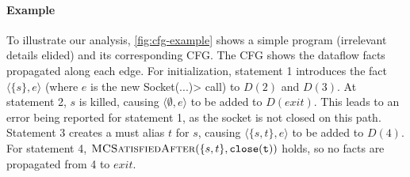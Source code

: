 \paragraph{Example} To illustrate our analysis, \cref{fig:cfg-example} shows a
simple program (irrelevant details elided) and its corresponding CFG.
The CFG shows the dataflow facts propagated along each edge.
For initialization, statement 1 introduces the fact $\langle \{ s \}, e
\rangle$ (where $e$ is the \<new Socket(...)> call) to $D(2)$ and $D(3)$.  At
statement 2, $s$ is killed, causing $\langle \emptyset , e \rangle$ to be added
to $D(\mathit{exit})$.  This leads to an error being reported for statement 1, as
the socket is not closed on this path.  Statement 3 creates a must alias $t$ for
$s$, causing $\langle \{ s, t \}, e \rangle$ to be added to $D(4)$.  For
statement 4, $\textsc{MCSatisfiedAfter}(\{s,t\},\mathtt{close(t)})$ holds, so no
facts are propagated from 4 to $\mathit{exit}$.




